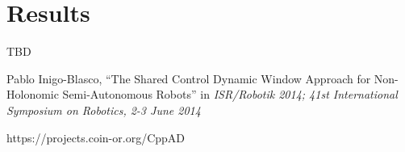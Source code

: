 \documentclass[a4paper,10pt]{article}
\begin{document}
\section{Results}

TBD


\begin{thebibliography}{1}

 Pablo Inigo-Blasco, ``The Shared Control Dynamic Window Approach for Non-Holonomic Semi-Autonomous Robots'' in \emph{ISR/Robotik 2014; 41st International Symposium on Robotics, 2-3 June 2014} 

 https://projects.coin-or.org/CppAD

\end{thebibliography}
\end{document}

